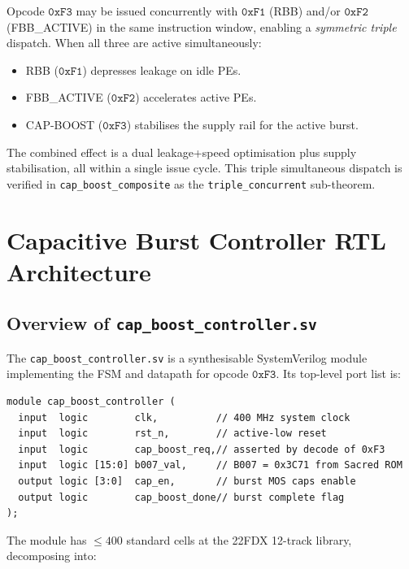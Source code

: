 \documentclass[12pt,a4paper]{report}
\theoremstyle{plain}
\theoremstyle{definition}
\theoremstyle{remark}
\begin{document}
Opcode $\texttt{0xF3}$ may be issued concurrently with $\texttt{0xF1}$
(RBB) and/or $\texttt{0xF2}$ (FBB\_ACTIVE) in the same instruction window,
enabling a \emph{symmetric triple} dispatch.
When all three are active simultaneously:
\begin{itemize}[leftmargin=1.5em]
  \item RBB ($\texttt{0xF1}$) depresses leakage on idle PEs.
  \item FBB\_ACTIVE ($\texttt{0xF2}$) accelerates active PEs.
  \item CAP-BOOST ($\texttt{0xF3}$) stabilises the supply rail for
    the active burst.
\end{itemize}
The combined effect is a dual leakage+speed optimisation plus supply
stabilisation, all within a single issue cycle.
This triple simultaneous dispatch is verified in \texttt{cap\_boost\_composite}
as the \texttt{triple\_concurrent} sub-theorem.

\section{Capacitive Burst Controller RTL Architecture}
\label{sec:rtl-architecture}

\subsection{Overview of \texttt{cap\_boost\_controller.sv}}
\label{ssec:rtl-overview}

The \texttt{cap\_boost\_controller.sv} is a synthesisable SystemVerilog
module implementing the FSM and datapath for opcode $\texttt{0xF3}$.
Its top-level port list is:

\begin{lstlisting}[style=verilog,caption={Top-level ports of \texttt{cap\_boost\_controller.sv}}]
module cap_boost_controller (
  input  logic        clk,          // 400 MHz system clock
  input  logic        rst_n,        // active-low reset
  input  logic        cap_boost_req,// asserted by decode of 0xF3
  input  logic [15:0] b007_val,     // B007 = 0x3C71 from Sacred ROM
  output logic [3:0]  cap_en,       // burst MOS caps enable
  output logic        cap_boost_done// burst complete flag
);
\end{lstlisting}

The module has $\leq 400$ standard cells at the 22FDX 12-track library,
decomposing into:
\end{document}
